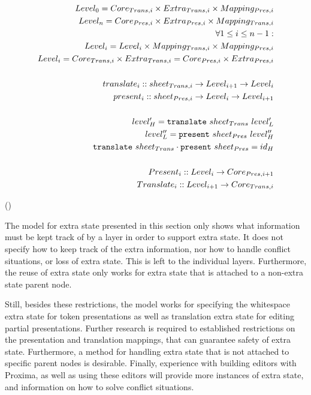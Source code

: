 \begin{small}\begin{align*}%
Level_{0} = Core_{Trans,i} \times Extra_{Trans,i} \times Mapping_{Pres,i}\\
Level_{n} = Core_{Pres,i} \times Extra_{Pres,i} \times Mapping_{Trans,i}\\
\forall 1 \le i \le n-1:  \\
Level_{i} = Level_{i} \times Mapping_{Trans,i} \times Mapping_{Pres,i}\\
Level_{i} = Core_{Trans,i} \times Extra_{Trans,i} = Core_{Pres,i} \times Extra_{Pres,i} \\
\\
translate_{i} :: sheet_{Trans,i} \rightarrow Level_{i+1} \rightarrow Level_{i}\\
present_{i} :: sheet_{Pres,i}  \rightarrow  Level_{i} \rightarrow Level_{i+1}\\
\\
level'_{H} = {\tt translate}~sheet_{Trans}~level'_{L}\\
level''_{L} = {\tt present}~sheet_{Pres}~level''_{H}\\
{\tt translate}~sheet_{Trans}  \cdot {\tt present}~sheet_{Pres} = id_{H}\\
\\
Present_{i} :: Level_{i} \rightarrow Core_{Pres,i+1}\\
Translate_{i} :: Level_{i+1} \rightarrow Core_{Trans,i}\\
\end{align*} 
\end{small}
{\centering ()\\}

The model for extra state presented in this section only shows what information must be kept track of by a layer in order to support extra state. It does not specify how to keep track of the extra information, nor how to handle conflict situations, or loss of extra state. This is left to the individual layers. Furthermore, the reuse of extra state only works for extra state that is attached to a non-extra state parent node. 

Still, besides these restrictions, the model works for specifying the whitespace extra state for token presentations as well as translation extra state for editing partial presentations. Further research is required to established restrictions on the presentation and translation mappings, that can guarantee safety of extra state. Furthermore, a method for handling extra state that is not attached to specific parent nodes is desirable. Finally, experience with building editors with Proxima, as well as using these editors will provide more instances of extra state, and information on how to solve conflict situations.

